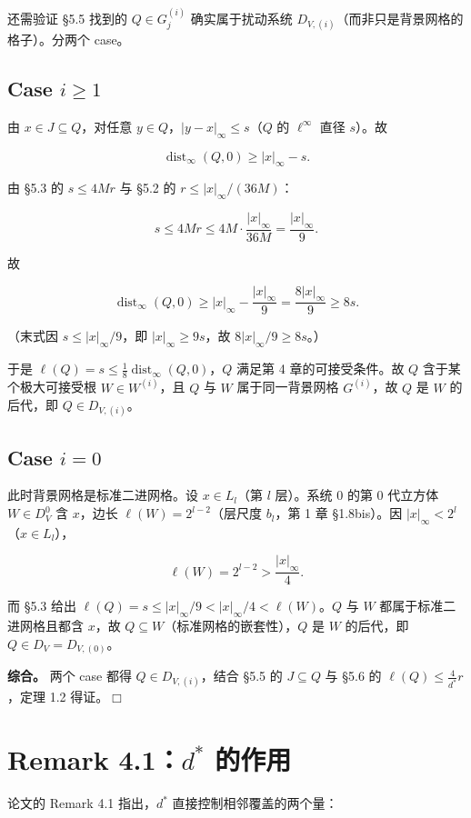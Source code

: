 \documentclass[a4paper,11pt,openany]{ctexbook}
\numberwithin{equation}{chapter}
\numberwithin{figure}{chapter}
\numberwithin{table}{chapter}
\begin{document}
还需验证 §5.5 找到的 $Q\in G_j^{(i)}$ 确实属于扰动系统 $D_{V,(i)}$（而非只是背景网格的格子）。分两个 case。

\subsection{Case $i\ge1$}

由 $x\in J\subseteq Q$，对任意 $y\in Q$，$|y-x|_\infty\le s$（$Q$ 的 $\ell^\infty$ 直径 $s$）。故

$$\operatorname{dist}_\infty(Q,0)\ge|x|_\infty-s.$$

由 §5.3 的 $s\le4Mr$ 与 §5.2 的 $r\le|x|_\infty/(36M)$：

$$s\le4Mr\le4M\cdot\frac{|x|_\infty}{36M}=\frac{|x|_\infty}{9}.$$

故

$$\operatorname{dist}_\infty(Q,0)\ge|x|_\infty-\frac{|x|_\infty}{9}=\frac{8|x|_\infty}{9}\ge8s.$$

（末式因 $s\le|x|_\infty/9$，即 $|x|_\infty\ge9s$，故 $8|x|_\infty/9\ge8s$。）

于是 $\ell(Q)=s\le\frac18\operatorname{dist}_\infty(Q,0)$，$Q$ 满足第 4 章的可接受条件。故 $Q$ 含于某个极大可接受根 $W\in W^{(i)}$，且 $Q$ 与 $W$ 属于同一背景网格 $G^{(i)}$，故 $Q$ 是 $W$ 的后代，即 $Q\in D_{V,(i)}$。

\subsection{Case $i=0$}

此时背景网格是标准二进网格。设 $x\in L_l$（第 $l$ 层）。系统 0 的第 0 代立方体 $W\in D_V^0$ 含 $x$，边长 $\ell(W)=2^{l-2}$（层尺度 $b_l$，第 1 章 §1.8bis）。因 $|x|_\infty<2^l$（$x\in L_l$），

$$\ell(W)=2^{l-2}>\frac{|x|_\infty}{4}.$$

而 §5.3 给出 $\ell(Q)=s\le|x|_\infty/9<|x|_\infty/4<\ell(W)$。$Q$ 与 $W$ 都属于标准二进网格且都含 $x$，故 $Q\subseteq W$（标准网格的嵌套性），$Q$ 是 $W$ 的后代，即 $Q\in D_V=D_{V,(0)}$。

\textbf{综合。} 两个 case 都得 $Q\in D_{V,(i)}$，结合 §5.5 的 $J\subseteq Q$ 与 §5.6 的 $\ell(Q)\le\frac4{d^*}r$，定理 1.2 得证。$\Box$

\section{Remark 4.1：$d^*$ 的作用}

论文的 Remark 4.1 指出，$d^*$ 直接控制相邻覆盖的两个量：
\end{document}
